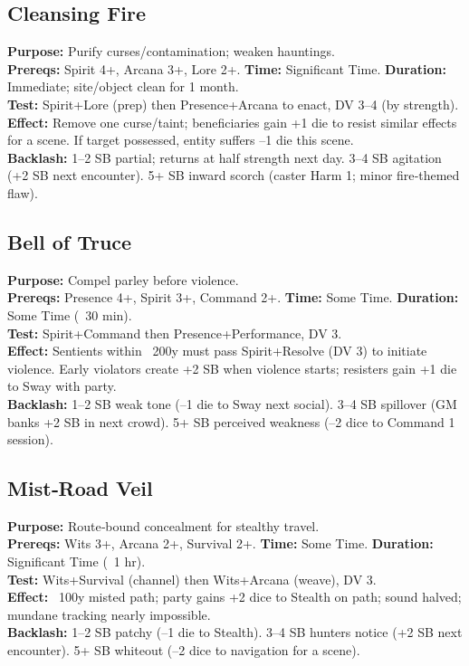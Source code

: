 \subsection*{Cleansing Fire}
\textbf{Purpose:} Purify curses/contamination; weaken hauntings.\\
\textbf{Prereqs:} Spirit 4+, Arcana 3+, Lore 2+. \quad \textbf{Time:} Significant Time. \quad \textbf{Duration:} Immediate; site/object clean for 1 month.\\
\textbf{Test:} Spirit+Lore (prep) then Presence+Arcana to enact, DV 3--4 (by strength).\\
\textbf{Effect:} Remove one curse/taint; beneficiaries gain +1 die to resist similar effects for a scene. If target possessed, entity suffers --1 die this scene.\\
\textbf{Backlash:} 1--2 SB partial; returns at half strength next day. 3--4 SB agitation (+2 SB next encounter). 5+ SB inward scorch (caster Harm 1; minor fire‑themed flaw).

\subsection*{Bell of Truce}
\textbf{Purpose:} Compel parley before violence.\\
\textbf{Prereqs:} Presence 4+, Spirit 3+, Command 2+. \quad \textbf{Time:} Some Time. \quad \textbf{Duration:} Some Time (~30 min).\\
\textbf{Test:} Spirit+Command then Presence+Performance, DV 3.\\
\textbf{Effect:} Sentients within ~200y must pass Spirit+Resolve (DV 3) to initiate violence. Early violators create +2 SB when violence starts; resisters gain +1 die to Sway with party.\\
\textbf{Backlash:} 1--2 SB weak tone (--1 die to Sway next social). 3--4 SB spillover (GM banks +2 SB in next crowd). 5+ SB perceived weakness (--2 dice to Command 1 session).

\subsection*{Mist‑Road Veil}
\textbf{Purpose:} Route‑bound concealment for stealthy travel.\\
\textbf{Prereqs:} Wits 3+, Arcana 2+, Survival 2+. \quad \textbf{Time:} Some Time. \quad \textbf{Duration:} Significant Time (~1 hr).\\
\textbf{Test:} Wits+Survival (channel) then Wits+Arcana (weave), DV 3.\\
\textbf{Effect:} ~100y misted path; party gains +2 dice to Stealth on path; sound halved; mundane tracking nearly impossible.\\
\textbf{Backlash:} 1--2 SB patchy (--1 die to Stealth). 3--4 SB hunters notice (+2 SB next encounter). 5+ SB whiteout (--2 dice to navigation for a scene).

